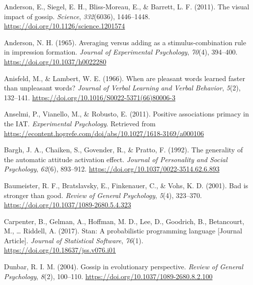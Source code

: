 \documentclass[
  man]{apa6}
\newlength{\cslhangindent}
\newlength{\cslentryspacingunit} %
\newenvironment{CSLReferences}[2] %
 {%
  \setlength{\parindent}{0pt}
  \ifodd #1
  \let\oldpar\par
  \def\par{\hangindent=\cslhangindent\oldpar}
  \fi
  \setlength{\parskip}{#2\cslentryspacingunit}
 }%
 {}
\begin{document}
\hypertarget{refs}{}
\begin{CSLReferences}{1}{0}
\leavevmode{}%
Anderson, E., Siegel, E. H., Bliss-Moreau, E., \& Barrett, L. F. (2011). The visual impact of gossip. \emph{Science}, \emph{332}(6036), 1446--1448. \url{https://doi.org/10.1126/science.1201574}

\leavevmode{}%
Anderson, N. H. (1965). Averaging versus adding as a stimulus-combination rule in impression formation. \emph{Journal of Experimental Psychology}, \emph{70}(4), 394--400. \url{https://doi.org/10.1037/h0022280}

\leavevmode{}%
Anisfeld, M., \& Lambert, W. E. (1966). When are pleasant words learned faster than unpleasant words? \emph{Journal of Verbal Learning and Verbal Behavior}, \emph{5}(2), 132--141. \url{https://doi.org/10.1016/S0022-5371(66)80006-3}

\leavevmode{}%
Anselmi, P., Vianello, M., \& Robusto, E. (2011). Positive associations primacy in the {IAT}. \emph{Experimental Psychology}. Retrieved from \url{https://econtent.hogrefe.com/doi/abs/10.1027/1618-3169/a000106}

\leavevmode{}%
Bargh, J. A., Chaiken, S., Govender, R., \& Pratto, F. (1992). The generality of the automatic attitude activation effect. \emph{Journal of Personality and Social Psychology}, \emph{62}(6), 893--912. \url{https://doi.org/10.1037/0022-3514.62.6.893}

\leavevmode{}%
Baumeister, R. F., Bratslavsky, E., Finkenauer, C., \& Vohs, K. D. (2001). Bad is stronger than good. \emph{Review of General Psychology}, \emph{5}(4), 323--370. \url{https://doi.org/10.1037/1089-2680.5.4.323}

\leavevmode{}%
Carpenter, B., Gelman, A., Hoffman, M. D., Lee, D., Goodrich, B., Betancourt, M., \ldots{} Riddell, A. (2017). Stan: A probabilistic programming language {[}Journal Article{]}. \emph{Journal of Statistical Software}, \emph{76}(1). \url{https://doi.org/10.18637/jss.v076.i01}

\leavevmode{}%
Dunbar, R. I. M. (2004). Gossip in evolutionary perspective. \emph{Review of General Psychology}, \emph{8}(2), 100--110. \url{https://doi.org/10.1037/1089-2680.8.2.100}


\end{CSLReferences}
\end{document}
